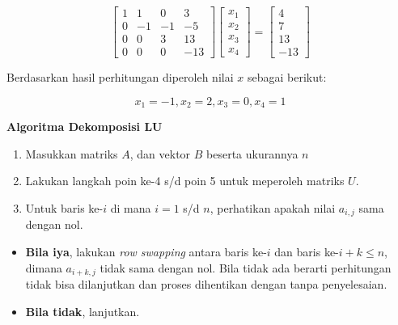 \documentclass[]{book}
\providecommand{\tightlist}{%
  \setlength{\itemsep}{0pt}\setlength{\parskip}{0pt}}
\theoremstyle{definition}
\theoremstyle{definition}
\theoremstyle{definition}
\theoremstyle{remark}
\begin{document}
\begin{equation*}
\begin{bmatrix}
     1       & 1       & 0       & 3           \\[0.3em]
     0       & -1      & -1      & -5          \\[0.3em]
     0       & 0       & 3       & 13          \\[0.3em]
     0       & 0       & 0       & -13
     \end{bmatrix}
\begin{bmatrix}
     x_1                                          \\[0.3em]
     x_2                                          \\[0.3em]
     x_3                                          \\[0.3em]
     x_4                                       
     \end{bmatrix}
= \begin{bmatrix}
     4                                          \\[0.3em]
     7                                          \\[0.3em]
     13                                          \\[0.3em]
     -13                      
     \end{bmatrix}
\end{equation*}

Berdasarkan hasil perhitungan diperoleh nilai \(x\) sebagai berikut:

\[
x_1=-1, x_2=2, x_3=0, x_4=1
\]

\textbf{Algoritma Dekomposisi LU}

\begin{enumerate}
\def\labelenumi{\arabic{enumi}.}
\tightlist
\item
  Masukkan matriks \(A\), dan vektor \(B\) beserta ukurannya \(n\)
\item
  Lakukan langkah poin ke-4 s/d poin 5 untuk meperoleh matriks \(U\).
\item
  Untuk baris ke-\(i\) di mana \(i=1\) s/d \(n\), perhatikan apakah nilai \(a_{i,j}\) sama dengan nol.
\end{enumerate}

\begin{itemize}
\tightlist
\item
  \textbf{Bila iya}, lakukan \emph{row swapping} antara baris ke-\(i\) dan baris ke-\(i+k\leq n\), dimana \(a_{i+k,j}\) tidak sama dengan nol. Bila tidak ada berarti perhitungan tidak bisa dilanjutkan dan proses dihentikan dengan tanpa penyelesaian.
\item
  \textbf{Bila tidak}, lanjutkan.
\end{itemize}
\end{document}
